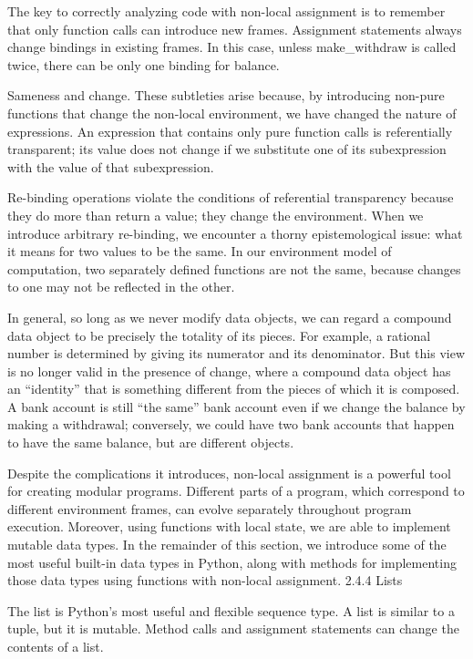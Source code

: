 \documentclass[letterpaper,10pt,dvipdfmx]{sphinxmanual}
\begin{document}
The key to correctly analyzing code with non-local assignment is to remember that only function calls can introduce new frames. Assignment statements always change bindings in existing frames. In this case, unless make\_withdraw is called twice, there can be only one binding for balance.

Sameness and change. These subtleties arise because, by introducing non-pure functions that change the non-local environment, we have changed the nature of expressions. An expression that contains only pure function calls is referentially transparent; its value does not change if we substitute one of its subexpression with the value of that subexpression.

Re-binding operations violate the conditions of referential transparency because they do more than return a value; they change the environment. When we introduce arbitrary re-binding, we encounter a thorny epistemological issue: what it means for two values to be the same. In our environment model of computation, two separately defined functions are not the same, because changes to one may not be reflected in the other.

In general, so long as we never modify data objects, we can regard a compound data object to be precisely the totality of its pieces. For example, a rational number is determined by giving its numerator and its denominator. But this view is no longer valid in the presence of change, where a compound data object has an ``identity'' that is something different from the pieces of which it is composed. A bank account is still ``the same'' bank account even if we change the balance by making a withdrawal; conversely, we could have two bank accounts that happen to have the same balance, but are different objects.

Despite the complications it introduces, non-local assignment is a powerful tool for creating modular programs. Different parts of a program, which correspond to different environment frames, can evolve separately throughout program execution. Moreover, using functions with local state, we are able to implement mutable data types. In the remainder of this section, we introduce some of the most useful built-in data types in Python, along with methods for implementing those data types using functions with non-local assignment.
2.4.4   Lists

The list is Python's most useful and flexible sequence type. A list is similar to a tuple, but it is mutable. Method calls and assignment statements can change the contents of a list.
\end{document}
